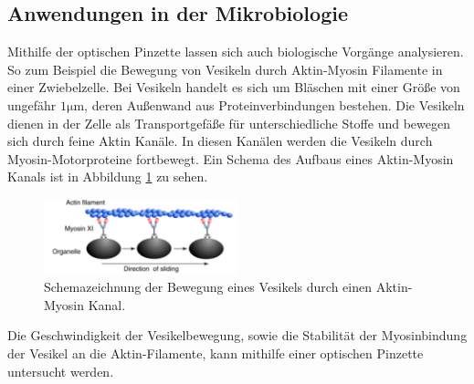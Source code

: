\subsection{Anwendungen in der Mikrobiologie}
Mithilfe der optischen Pinzette lassen sich auch biologische Vorgänge analysieren. So zum Beispiel die Bewegung von Vesikeln durch Aktin-Myosin Filamente in einer Zwiebelzelle. Bei Vesikeln handelt es sich um Bläschen mit einer Größe von ungefähr $1 \si{\micro\meter}$, deren Außenwand aus Proteinverbindungen bestehen. Die Vesikeln dienen in der Zelle als Transportgefäße für unterschiedliche Stoffe und bewegen sich durch feine Aktin Kanäle. In diesen Kanälen werden die Vesikeln durch Myosin-Motorproteine fortbewegt. Ein Schema des Aufbaus eines Aktin-Myosin Kanals ist in Abbildung \ref{fig:aktin} zu sehen.
\begin{figure}[H]
  \centering
  \includegraphics[width=0.5\textwidth]{plots/aktin.jpg}
  \caption{Schemazeichnung der Bewegung eines Vesikels durch einen Aktin-Myosin Kanal. \cite{anleitung}}
  \label{fig:aktin}
\end{figure}
Die Geschwindigkeit der Vesikelbewegung, sowie die Stabilität der Myosinbindung der Vesikel an die Aktin-Filamente, kann mithilfe einer optischen Pinzette untersucht werden. \cite{anleitung}
